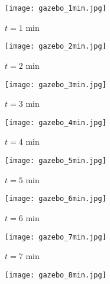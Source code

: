 \begin{figure}[!t]
    	\begin{subfigure}[t]{0.24\columnwidth}
           	\centering
          	\texttt{[image: gazebo\_1min.jpg]}
        		\caption{$t=1$ min}
    	\end{subfigure}
    	\begin{subfigure}[t]{0.24\columnwidth}
           	\centering
          	\texttt{[image: gazebo\_2min.jpg]}
        		\caption{$t=2$ min}
    	\end{subfigure}
    	\begin{subfigure}[t]{0.24\columnwidth}
           	\centering
          	\texttt{[image: gazebo\_3min.jpg]}
        		\caption{$t=3$ min}
   	\end{subfigure}
    	\begin{subfigure}[t]{0.24\columnwidth}
           	\centering
          	\texttt{[image: gazebo\_4min.jpg]}
        		\caption{$t=4$ min}
    	\end{subfigure}
	\begin{subfigure}[t]{0.24\columnwidth}
	\vspace*{0.15\columnwidth}
           	\centering
          	\texttt{[image: gazebo\_5min.jpg]}
        		\caption{$t=5$ min}
    	\end{subfigure}
    	\begin{subfigure}[t]{0.24\columnwidth}
	\vspace*{0.15\columnwidth}
           	\centering
          	\texttt{[image: gazebo\_6min.jpg]}
        		\caption{$t=6$ min}
    	\end{subfigure}
    	\begin{subfigure}[t]{0.24\columnwidth}
	\vspace*{0.15\columnwidth}
           	\centering
          	\texttt{[image: gazebo\_7min.jpg]}
        		\caption{$t=7$ min}
   	\end{subfigure}
    	\begin{subfigure}[t]{0.24\columnwidth}
	\vspace*{0.15\columnwidth}
           	\centering
          	\texttt{[image: gazebo\_8min.jpg]}

\end{subfigure}
\end{figure}

